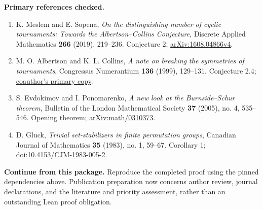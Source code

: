 \documentclass[11pt]{article}
\begin{document}
\newpage
\textbf{Primary references checked.}
\begin{enumerate}
\item K. Meslem and E. Sopena, \emph{On the distinguishing number of
cyclic tournaments: Towards the Albertson--Collins Conjecture},
Discrete Applied Mathematics \textbf{266} (2019), 219--236.
Conjecture 2; \href{https://arxiv.org/html/1608.04866v4}{arXiv:1608.04866v4}.
\item M. O. Albertson and K. L. Collins, \emph{A note on breaking the
symmetries of tournaments}, Congressus Numerantium \textbf{136}
(1999), 129--131. Conjecture 2.4;
\href{https://kcollins.web.wesleyan.edu/publications/symnote-saks.pdf}{coauthor's primary copy}.
\item S. Evdokimov and I. Ponomarenko, \emph{A new look at the
Burnside--Schur theorem}, Bulletin of the London Mathematical Society
\textbf{37} (2005), no. 4, 535--546. Opening theorem;
\href{https://arxiv.org/pdf/math/0310373}{arXiv:math/0310373}.
\item D. Gluck, \emph{Trivial set-stabilizers in finite permutation
groups}, Canadian Journal of Mathematics \textbf{35} (1983), no. 1,
59--67. Corollary 1;
\href{https://doi.org/10.4153/CJM-1983-005-2}{doi:10.4153/CJM-1983-005-2}.
\end{enumerate}

\textbf{Continue from this package.} Reproduce the completed proof
using the pinned dependencies above. Publication preparation now concerns
author review, journal declarations, and the literature and priority
assessment, rather than an outstanding Lean proof obligation.
\end{document}
